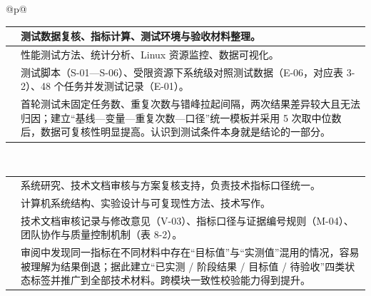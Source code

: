 \begin{longtable}{@{}p{\linewidth}@{}}
\begin{minipage}{\linewidth}
\begin{tabular}{@{}>{\raggedright\arraybackslash}p{}>{\raggedright\arraybackslash}p{}@{}}
\rowcolor{white} \TableHeaderText{承担任务} & 测试数据复核、指标计算、测试环境与验收材料整理。 \\ \hline
\rowcolor{white} \TableHeaderText{使用的专业知识} & 性能测试方法、统计分析、Linux 资源监控、数据可视化。 \\ \hline
\rowcolor{white} \TableHeaderText{交付成果与材料编号} & 测试脚本（S-01---S-06）、受限资源下系统级对照测试数据（E-06，对应表 3-2）、48 个任务并发测试记录（E-01）。 \\ \hline
\rowcolor{white} \TableHeaderText{遇到的问题与能力提升} & 首轮测试未固定任务数、重复次数与错峰拉起间隔，两次结果差异较大且无法归因；建立“基线---变量---重复次数---口径”统一模板并采用 5 次取中位数后，数据可复核性明显提高。认识到测试条件本身就是结论的一部分。 \\ \hline
\end{tabular}
\end{minipage} \\[6pt]
\begin{minipage}{\linewidth}
\begin{tabular}{@{}>{\raggedright\arraybackslash}p{}>{\raggedright\arraybackslash}p{}@{}}
\hline
\rowcolor{WordTableHeader}\multicolumn{2}{@{}p{\linewidth}@{}}{\RecordHeading{姓名与专业：周以恒\quad 2026 级硕士\quad 计算机科学与技术}} \\ \hline
\rowcolor{white} \TableHeaderText{承担任务} & 系统研究、技术文档审核与方案复核支持，负责技术指标口径统一。 \\ \hline
\rowcolor{white} \TableHeaderText{使用的专业知识} & 计算机系统结构、实验设计与可复现性方法、技术写作。 \\ \hline
\rowcolor{white} \TableHeaderText{交付成果与材料编号} & 技术文档审核记录与修改意见（V-03）、指标口径与证据编号规则（M-04）、团队协作与质量控制机制（表 8-2）。 \\ \hline
\rowcolor{white} \TableHeaderText{遇到的问题与能力提升} & 审阅中发现同一指标在不同材料中存在“目标值”与“实测值”混用的情况，容易被理解为结果倒退；据此建立“已实测 /\allowbreak{} 阶段结果 /\allowbreak{} 目标值 /\allowbreak{} 待验收”四类状态标签并推广到全部技术材料。跨模块一致性校验能力得到提升。 \\ \hline
\end{tabular}
\end{minipage} \\[6pt]
\end{longtable}\endgroup
\par{}

